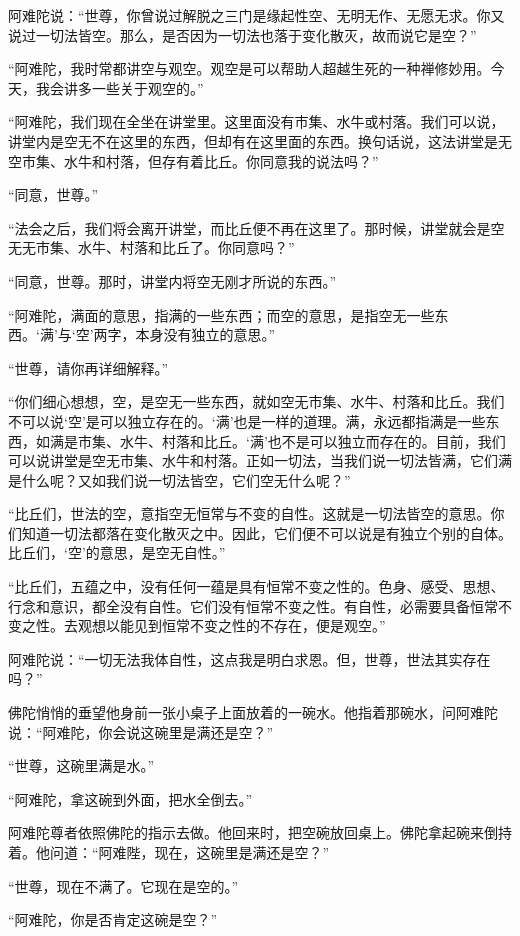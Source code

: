 \documentclass[12pt,twoside,openany]{book}
\begin{document}
阿难陀说：“世尊，你曾说过解脱之三门是缘起性空、无明无作、无愿无求。你又说过一切法皆空。那么，是否因为一切法也落于变化散灭，故而说它是空？”

“阿难陀，我时常都讲空与观空。观空是可以帮助人超越生死的一种禅修妙用。今天，我会讲多一些关于观空的。”

“阿难陀，我们现在全坐在讲堂里。这里面没有市集、水牛或村落。我们可以说，讲堂内是空无不在这里的东西，但却有在这里面的东西。换句话说，这法讲堂是无空市集、水牛和村落，但存有着比丘。你同意我的说法吗？”

“同意，世尊。”

“法会之后，我们将会离开讲堂，而比丘便不再在这里了。那时候，讲堂就会是空无无市集、水牛、村落和比丘了。你同意吗？”

“同意，世尊。那时，讲堂内将空无刚才所说的东西。”

“阿难陀，满面的意思，指满的一些东西；而空的意思，是指空无一些东西。‘满’与‘空’两字，本身没有独立的意思。”

“世尊，请你再详细解释。”

“你们细心想想，空，是空无一些东西，就如空无市集、水牛、村落和比丘。我们不可以说‘空’是可以独立存在的。‘满’也是一样的道理。满，永远都指满是一些东西，如满是市集、水牛、村落和比丘。‘满’也不是可以独立而存在的。目前，我们可以说讲堂是空无市集、水牛和村落。正如一切法，当我们说一切法皆满，它们满是什么呢？又如我们说一切法皆空，它们空无什么呢？”

“比丘们，世法的空，意指空无恒常与不变的自性。这就是一切法皆空的意思。你们知道一切法都落在变化散灭之中。因此，它们便不可以说是有独立个别的自体。比丘们，‘空’的意思，是空无自性。”

“比丘们，五蕴之中，没有任何一蕴是具有恒常不变之性的。色身、感受、思想、行念和意识，都全没有自性。它们没有恒常不变之性。有自性，必需要具备恒常不变之性。去观想以能见到恒常不变之性的不存在，便是观空。”

阿难陀说：“一切无法我体自性，这点我是明白求恩。但，世尊，世法其实存在吗？”

佛陀悄悄的垂望他身前一张小桌子上面放着的一碗水。他指着那碗水，问阿难陀说：“阿难陀，你会说这碗里是满还是空？”

“世尊，这碗里满是水。”

“阿难陀，拿这碗到外面，把水全倒去。”

阿难陀尊者依照佛陀的指示去做。他回来时，把空碗放回桌上。佛陀拿起碗来倒持着。他问道：“阿难陛，现在，这碗里是满还是空？”

“世尊，现在不满了。它现在是空的。”

“阿难陀，你是否肯定这碗是空？”
\end{document}
